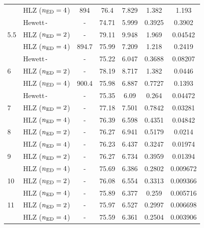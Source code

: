 \begin{table}[htbp!]
\begin{tabular}{ll|ccccc}
		           & HLZ ($n_{\rm ED}=4$) & 894          & 76.4       & 7.829     & 1.382      & 1.193        \\
		           & Hewett\texttt{-}        & -            & 74.71      & 5.999     & 0.3925     & 0.3902       \\
		5.5        & HLZ ($n_{\rm ED}=2$) & -            & 79.11      & 9.948     & 1.969      & 0.04542      \\
		           & HLZ ($n_{\rm ED}=4$) & 894.7        & 75.99      & 7.209     & 1.218      & 0.2419       \\
		           & Hewett\texttt{-}        & -            & 75.22      & 6.047     & 0.3688     & 0.08207      \\
		6          & HLZ ($n_{\rm ED}=2$) & -            & 78.19      & 8.717     & 1.382      & 0.0446       \\
		           & HLZ ($n_{\rm ED}=4$) & 900.4        & 75.98      & 6.887     & 0.7727     & 0.1393       \\
		           & Hewett\texttt{-}        & -            & 75.35      & 6.09      & 0.264      & 0.04472      \\
		7          & HLZ ($n_{\rm ED}=2$) & -            & 77.18      & 7.501     & 0.7842     & 0.03281      \\
		           & HLZ ($n_{\rm ED}=4$) & -            & 76.39      & 6.598     & 0.4351     & 0.04842      \\
		8          & HLZ ($n_{\rm ED}=2$) & -            & 76.27      & 6.941     & 0.5179     & 0.0214       \\
		           & HLZ ($n_{\rm ED}=4$) & -            & 76.23      & 6.437     & 0.3247     & 0.01974      \\
		9          & HLZ ($n_{\rm ED}=2$) & -            & 76.27      & 6.734     & 0.3959     & 0.01394      \\
		           & HLZ ($n_{\rm ED}=4$) & -            & 75.69      & 6.386     & 0.2802     & 0.009672     \\
		10         & HLZ ($n_{\rm ED}=2$) & -            & 76.08      & 6.554     & 0.3313     & 0.009366     \\
		           & HLZ ($n_{\rm ED}=4$) & -            & 75.89      & 6.377     & 0.259      & 0.005716     \\
		11         & HLZ ($n_{\rm ED}=2$) & -            & 75.97      & 6.527     & 0.2997     & 0.006698     \\
		           & HLZ ($n_{\rm ED}=4$) & -            & 75.59      & 6.361     & 0.2504     & 0.003906     \\
		\hline
		\hline
	\end{tabular}
\end{table}

